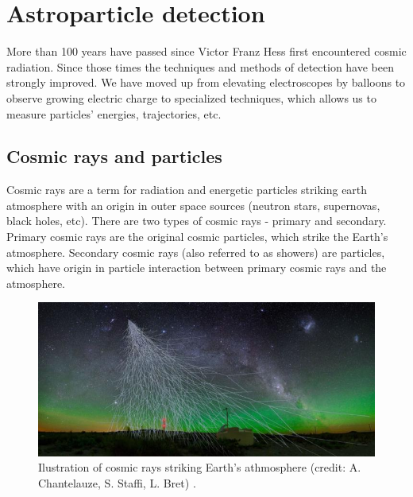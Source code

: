 
\chapter{Astroparticle detection}
More than 100 years have passed since Victor Franz Hess first encountered cosmic radiation. Since those times the techniques and methods of detection have been strongly improved. We have moved up from elevating electroscopes by balloons to observe growing electric charge to specialized techniques, which allows us to measure particles' energies, trajectories, etc.

\section{Cosmic rays and particles}
Cosmic rays are a term for radiation and energetic particles striking earth atmosphere with an origin in outer space sources (neutron stars, supernovas, black holes, etc). There are two types of cosmic rays - primary and secondary. Primary cosmic rays are the original cosmic particles, which strike the Earth's atmosphere. Secondary cosmic rays (also referred to as showers) are particles, which have origin in particle interaction between primary cosmic rays and the atmosphere.
\par
\begin{figure}[H]
 \centering
 \includegraphics[scale = 0.6]{./pictures/rays}
 \caption{Ilustration of cosmic rays striking Earth's athmosphere (credit: A. Chantelauze, S. Staffi, L. Bret) \cite{intro}.}
 \label{cascade}
 
\end{figure}


